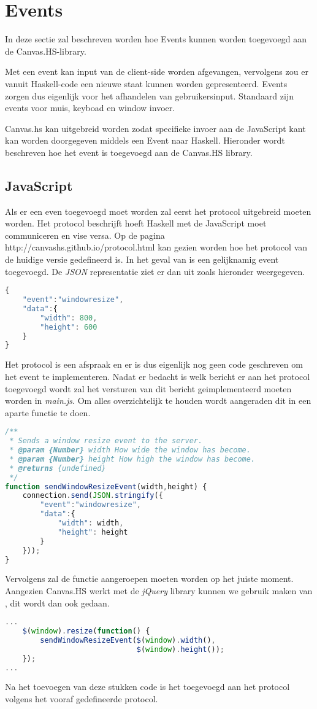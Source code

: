 \section{Events}
In deze sectie zal beschreven worden hoe Events kunnen worden toegevoegd aan de Canvas.HS-library.

Met een event kan input van de client-side worden afgevangen, vervolgens zou er vanuit Haskell-code een nieuwe staat kunnen worden gepresenteerd. Events zorgen dus eigenlijk voor het afhandelen van gebruikersinput. Standaard zijn events voor muis, keyboad en window invoer.

Canvas.hs kan uitgebreid worden zodat specifieke invoer aan de JavaScript kant kan worden doorgegeven middels een Event naar Haskell. Hieronder wordt beschreven hoe het  event is toegevoegd aan de Canvas.HS library.
\subsection{JavaScript}
Als er een even toegevoegd moet worden zal eerst het protocol uitgebreid moeten worden. Het protocol beschrijft hoeft Haskell met de JavaScript moet communiceren en vise versa. Op de pagina http://canvashs.github.io/protocol.html kan gezien worden hoe het protocol van de huidige versie gedefineerd is. In het geval van  is een gelijknamig event toegevoegd. De \emph{JSON} representatie ziet er dan uit zoals hieronder weergegeven.
\begin{lstlisting}[language=JavaScript]
{
    "event":"windowresize",
    "data":{
        "width": 800,
        "height": 600
    }
}
\end{lstlisting}
Het protocol is een afspraak en er is dus eigenlijk nog geen code geschreven om het event te implementeren. Nadat er bedacht is welk bericht er aan het protocol toegevoegd wordt zal het versturen van dit bericht geimplementeerd moeten worden in \emph{main.js}. Om alles overzichtelijk te houden wordt aangeraden dit in een aparte functie te doen.
\begin{lstlisting}[language=JavaScript]
/**
 * Sends a window resize event to the server.
 * @param {Number} width How wide the window has become.
 * @param {Number} height How high the window has become.
 * @returns {undefined}
 */
function sendWindowResizeEvent(width,height) {
    connection.send(JSON.stringify({
        "event":"windowresize",
        "data":{
            "width": width,
            "height": height
        }
    }));
}
\end{lstlisting}
Vervolgens zal de functie  aangeroepen moeten worden op het juiste moment. Aangezien Canvas.HS werkt met de \emph{jQuery} library kunnen we gebruik maken van , dit wordt dan ook gedaan.
\begin{lstlisting}[language=JavaScript]
...
    $(window).resize(function() {
        sendWindowResizeEvent($(window).width(),
        					  $(window).height());
    });
...
\end{lstlisting}
Na het toevoegen van deze stukken code is het  toegevoegd aan het protocol volgens het vooraf gedefineerde protocol.
